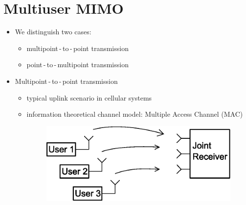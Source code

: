 \documentclass[a4paper, 10pt]{article}
\begin{document}
\setcounter{section}{2}
\section{Multiuser MIMO}
\begin{itemize}
	\item We distinguish two cases:
	\begin{itemize}
		\item multipoint\,-\,to\,-\,point transmission
		\item point\,-\,to\,-\,multipoint transmission
	\end{itemize}
	\item Multipoint\,-\,to\,-\,point transmission
	\begin{itemize}
		\item typical uplink scenario in cellular systems
		\item information theoretical channel model: Multiple Access Channel (MAC)
		\begin{figure}[h]\centering
			\includegraphics[scale=0.8]{MAC}
		\end{figure}

\end{itemize}
\end{itemize}
\end{document}
